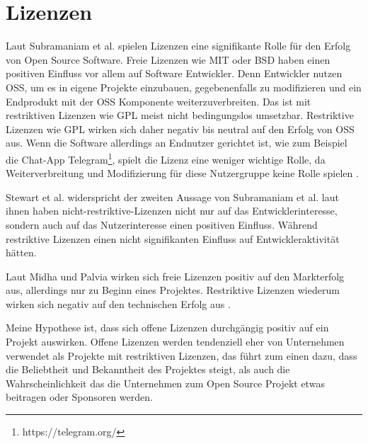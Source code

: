 \section{Lizenzen}




Laut Subramaniam et al. spielen Lizenzen eine signifikante Rolle für den Erfolg von
Open Source Software.
Freie Lizenzen wie MIT oder BSD haben einen positiven Einfluss vor allem auf Software Entwickler.
Denn Entwickler nutzen OSS, um es in eigene Projekte einzubauen, gegebenenfalls zu modifizieren
und ein Endprodukt mit der OSS Komponente weiterzuverbreiten. Das ist mit restriktiven Lizenzen
wie GPL meist nicht bedingungslos umsetzbar. Restriktive Lizenzen wie GPL wirken sich daher
negativ bis neutral auf den Erfolg von OSS aus. Wenn die Software allerdings an Endnutzer
gerichtet ist, wie zum Beispiel die Chat-App Telegram\footnote{https://telegram.org/}, spielt die
Lizenz eine weniger wichtige Rolle, da Weiterverbreitung und Modifizierung für diese Nutzergruppe
keine Rolle spielen \cite{subramaniamDeterminantsOpenSource2009}.

Stewart et al. widerspricht der zweiten Aussage von Subramaniam et al. laut ihnen
haben nicht-restriktive-Lizenzen nicht nur auf das Entwicklerinteresse, sondern auch auf das
Nutzerinteresse einen positiven Einfluss. %
Während restriktive Lizenzen einen nicht signifikanten Einfluss auf
Entwickleraktivität hätten. \cite{stewartImpactsLicenseChoice2006a}

Laut Midha und Palvia wirken sich freie Lizenzen positiv auf den Markterfolg aus, allerdings
nur zu Beginn eines Projektes. %
Restriktive Lizenzen wiederum wirken sich negativ auf den technischen Erfolg aus %
\cite{midhaFactorsAffectingSuccess2012}.


Meine Hypothese ist, dass sich offene Lizenzen durchgängig positiv auf ein Projekt auswirken.
Offene Lizenzen werden tendenziell eher von Unternehmen verwendet als Projekte mit restriktiven
Lizenzen, das führt zum einen dazu, dass die Beliebtheit und Bekanntheit des Projektes steigt, als
auch die Wahrscheinlichkeit das die Unternehmen zum Open Source Projekt etwas beitragen oder
Sponsoren werden.


